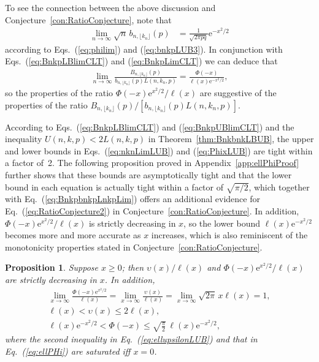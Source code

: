 \documentclass[aop]{imsart}
\theoremstyle{plain}
\newtheorem{proposition}[theorem]{Proposition}
\theoremstyle{remark}
\newcommand{\rme}{\mathrm{e}}
\newcommand{\1}{\operatorname{\uppercase\expandafter{\romannumeral1}}}
\newcommand{\2}{\operatorname{\uppercase\expandafter{\romannumeral2}}}
\newcommand{\3}{\operatorname{\uppercase\expandafter{\romannumeral3}}}
\newcommand{\4}{\operatorname{\uppercase\expandafter{\romannumeral4}}}
\newcommand{\5}{\operatorname{\uppercase\expandafter{\romannumeral5}}}
\newcommand{\6}{\operatorname{\uppercase\expandafter{\romannumeral6}}}
\newcommand{\7}{\operatorname{\uppercase\expandafter{\romannumeral7}}}
\newcommand{\8}{\operatorname{\uppercase\expandafter{\romannumeral8}}}
\newcommand{\9}{\operatorname{\uppercase\expandafter{\romannumeral9}}}
\newcommand{\eref}[1]{Eq.~\textup{(\ref{#1})}}
\newcommand{\eqsref}[2]{Eqs.~(\ref{#1}) and (\ref{#2})}
\newcommand{\thref}[1]{Theorem~\ref{#1}}
\newcommand{\cref}[1]{Conjecture~\ref{#1}}
\newcommand{\aref}[1]{Appendix~\ref{#1}}
\begin{document}
To see the connection between the above discussion and \cref{con:RatioConjecture}, note that
\begin{align}
\lim_{n\to\infty }\sqrt{n}\, b_{n,\lfloor k_n\rfloor}(p)&=\frac{1}{\sqrt{2\pi pq}}\rme^{-x^2/2}
\end{align}
according to \eqsref{eq:philim}{eq:bnkpLUB3}. In conjunction with \eqsref{eq:BnkpLBlimCLT}{eq:BnkpLimCLT} we can deduce that
\begin{align}
\lim_{n\to\infty }\frac{B_{n,\lfloor k_n\rfloor}(p)}{b_{n,\lfloor k_n\rfloor}(p)L(n,k_n,p)}=\frac{\Phi(-x)}{\ell(x)\rme^{-x^2/2}}, \label{eq:BnkpbnkpLnkpLim}
\end{align}
so the properties of the ratio $\Phi(-x)\rme^{x^2/2}/\ell(x)$ are suggestive of the properties of the ratio $B_{n,\lfloor k_n\rfloor}(p)/[b_{n,\lfloor k_n\rfloor}(p)L(n,k_n,p)]$.

 According to \eqsref{eq:BnkpLBlimCLT}{eq:BnkpUBlimCLT} and the inequality $U(n,k,p)< 2L(n,k,p)$ in  \thref{thm:BnkbnkLBUB}, the upper and lower bounds in \eqsref{eq:nknLimLUB}{eq:PhixLUB} are  tight within a factor of~2. 
The following proposition proved in \aref{app:ellPhiProof} further shows that these bounds are asymptotically tight and that the lower bound in each equation is actually  tight within a factor of $\sqrt{\pi/2}$, which together with \eref{eq:BnkpbnkpLnkpLim} offers an additional evidence for \eref{eq:RatioConjecture2} in  \cref{con:RatioConjecture}.
In addition, $\Phi(-x)\rme^{x^2/2}/\ell(x)$ is strictly decreasing in $x$, so  the lower bound $\ell(x)\rme^{-x^2/2}$ becomes more and more accurate as $x$ increases, which is also
 reminiscent of the monotonicity properties stated in \cref{con:RatioConjecture}.
\begin{proposition}\label{pro:ellPhi}
	Suppose $x\geq 0$; then $\upsilon(x)/\ell(x)$ and  $\Phi(-x)\rme^{x^2/2}/\ell(x)$ are strictly decreasing in $x$. In addition,
	\begin{gather}
	\lim_{x\to \infty}\frac{\Phi(-x)\rme^{x^2/2}}{\ell(x)}=
	\lim_{x\to \infty}\frac{\upsilon(x)}{\ell(x)}=\lim_{x\to \infty}\sqrt{2\pi} \,x\ell(x)=1, \label{eq:ellupPhiLim}	\\	
	\ell(x)< \upsilon(x)\leq 2\ell(x),\label{eq:ellupsilonLUB}\\	\ell(x)\rme^{-x^2/2}< \Phi(-x)\leq  \sqrt{\frac{\pi}{2}}\,\ell(x)\rme^{-x^2/2},\label{eq:ellPHi} 
	\end{gather}
	where the second inequality in \eref{eq:ellupsilonLUB} and that in \eref{eq:ellPHi}  are saturated iff $x=0$.	
\end{proposition}
\end{document}

